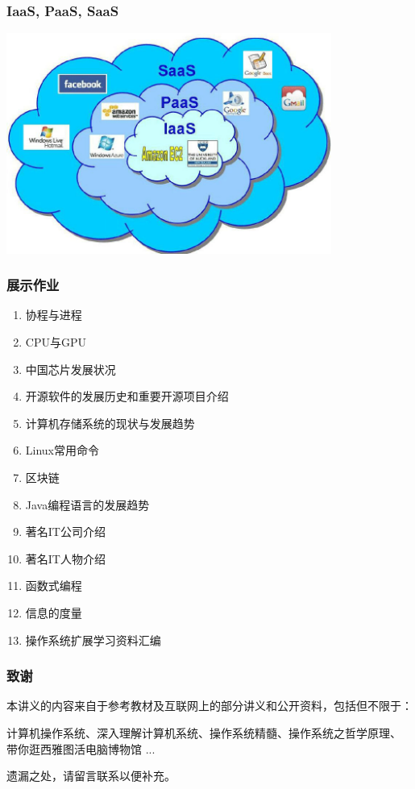 \documentclass[table, t,13pt]{beamer}
\begin{document}
\begin{frame}[fragile]
  \frametitle{IaaS, PaaS, SaaS}
  \includegraphics[width=0.8\textwidth]{figure/cos/iaas2.png}
\end{frame}


  \begin{frame}
    \frametitle{展示作业}
    \begin{enumerate}
    \item 协程与进程
    \item CPU与GPU
    \item 中国芯片发展状况
    \item 开源软件的发展历史和重要开源项目介绍
    \item 计算机存储系统的现状与发展趋势
    \item Linux常用命令
    \item 区块链
    \item Java编程语言的发展趋势
    \item 著名IT公司介绍
    \item 著名IT人物介绍
    \item 函数式编程
    \item 信息的度量
    \item 操作系统扩展学习资料汇编 
    \end{enumerate}
  \end{frame}

\begin{frame}[fragile]
  \frametitle{致谢}

  本讲义的内容来自于参考教材及互联网上的部分讲义和公开资料，包括但不限于：

  计算机操作系统、深入理解计算机系统、操作系统精髓、操作系统之哲学原理、
  带你逛西雅图活电脑博物馆 ...

  遗漏之处，请留言联系以便补充。
\end{frame}
\end{document}
